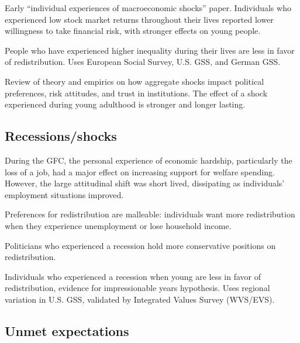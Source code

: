 \documentclass{article}
\newcommand{\citem}[1]{\medskip \noindent \textbf{\cite*{#1}}}
\begin{document}
\citem{malmendier2011depression}

Early ``individual experiences of macroeconomic shocks'' paper. Individuals who experienced low stock market returns throughout their lives reported lower willingness to take financial risk, with stronger effects on young people.

\citem{roth2018experienced}

People who have experienced higher inequality during their lives are less in favor of redistribution. Uses European Social Survey, U.S. GSS, and German GSS.

\citem{giuliano2024aggregate}

Review of theory and empirics on how aggregate shocks impact political preferences, risk attitudes, and trust in institutions. The effect of a shock experienced during young adulthood is stronger and longer lasting.

\subsection{Recessions/shocks}

\citem{margalit2013explaining}

During the GFC, the personal experience of economic hardship, particularly the loss of a job, had a major effect on increasing support for welfare
spending. However, the large attitudinal shift was short lived, dissipating
as individuals’ employment situations improved.

\citem{owens2013material}

Preferences for redistribution are malleable: individuals want more redistribution when they experience unemployment or lose household income.

\citem{carreri2023economic}

Politicians who experienced a recession hold more conservative positions on redistribution.

\citem{giuliano2023recessions}

Individuals who experienced a recession when young are less in favor of redistribution, evidence for impressionable years hypothesis. Uses regional variation in U.S. GSS, validated by Integrated Values Survey (WVS/EVS).

\subsection{Unmet expectations}

\citem{kurer2022disappointed}
\end{document}
